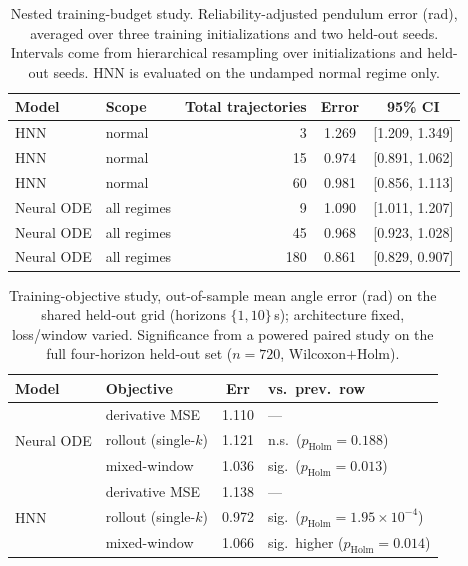 \documentclass{article}
\begin{document}
\begin{table}[tbp]
\centering\small
\caption{Nested training-budget study. Reliability-adjusted pendulum error (rad), averaged
over three training initializations and two held-out seeds. Intervals come from hierarchical resampling over
initializations and held-out seeds. HNN is evaluated on the undamped normal regime only.}
\label{tab:budget}
\begin{tabular}{llrcc}
\toprule
Model & Scope & Total trajectories & Error & 95\% CI \\
\midrule
HNN & normal & 3 & 1.269 & [1.209, 1.349] \\
HNN & normal & 15 & 0.974 & [0.891, 1.062] \\
HNN & normal & 60 & 0.981 & [0.856, 1.113] \\
Neural ODE & all regimes & 9 & 1.090 & [1.011, 1.207] \\
Neural ODE & all regimes & 45 & 0.968 & [0.923, 1.028] \\
Neural ODE & all regimes & 180 & 0.861 & [0.829, 0.907] \\
\bottomrule
\end{tabular}
\end{table}

\begin{table}[tbp]
\centering\small
\caption{Training-objective study, out-of-sample mean angle error (rad) on the shared
held-out grid (horizons $\{1,10\}$\,s); architecture fixed, loss/window varied. Significance
from a powered paired study on the full four-horizon held-out set ($n{=}720$,
Wilcoxon$+$Holm).}\label{tab:objective}
\begin{tabular}{llcl}
\toprule
Model & Objective & Err & vs.\ prev.\ row \\
\midrule
\multirow{3}{*}{Neural ODE}
 & derivative MSE & 1.110 & --- \\
 & rollout (single-$k$) & 1.121 & n.s.\ ($p_{\mathrm{Holm}}{=}0.188$) \\
 & mixed-window & 1.036 & sig.\ ($p_{\mathrm{Holm}}{=}0.013$) \\
\midrule
\multirow{3}{*}{HNN}
 & derivative MSE & 1.138 & --- \\
 & rollout (single-$k$) & 0.972 & sig.\ ($p_{\mathrm{Holm}}{=}1.95{\times}10^{-4}$) \\
 & mixed-window & 1.066 & sig.\ higher ($p_{\mathrm{Holm}}{=}0.014$) \\
\bottomrule
\end{tabular}
\end{table}
\end{document}

